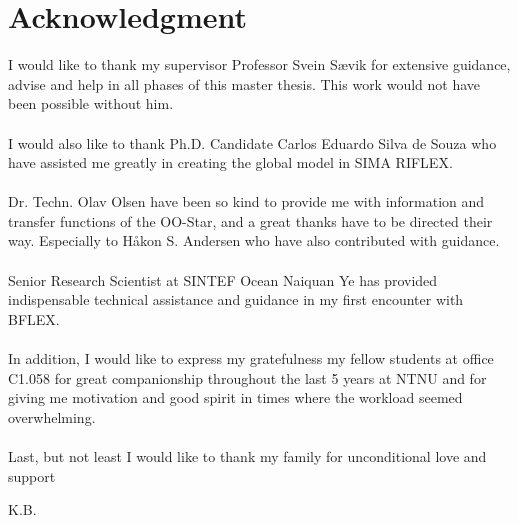\chapter*{Acknowledgment}
I would like to thank my supervisor Professor Svein Sævik for extensive guidance, advise and help in all phases of this master thesis. This work would not have been possible without him. \\\\I would also like to thank Ph.D. Candidate Carlos Eduardo Silva de Souza who have assisted me greatly in creating the global model in SIMA RIFLEX. \\\\  Dr. Techn. Olav Olsen have been so kind to provide me with information and transfer functions of the OO-Star, and a great thanks have to be directed their way. Especially to Håkon S. Andersen who have also contributed with guidance. \\\\ Senior Research Scientist at SINTEF Ocean Naiquan Ye has provided indispensable technical assistance and guidance in my first encounter with BFLEX. \\\\ In addition, I would like to express my gratefulness my fellow students at office C1.058 for great companionship throughout the last 5 years at NTNU and for giving me motivation and good spirit in times where the workload seemed overwhelming. \\\\ Last, but not least I would like to thank my family for unconditional love and support


\newline
\newline
\newline

\begin{flushright}
K.B.
\end{flushright}

